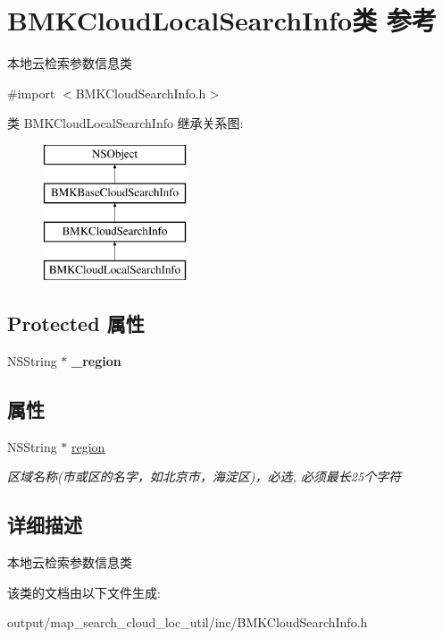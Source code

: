 \hypertarget{interface_b_m_k_cloud_local_search_info}{\section{B\+M\+K\+Cloud\+Local\+Search\+Info类 参考}
\label{interface_b_m_k_cloud_local_search_info}
}


本地云检索参数信息类  




{\ttfamily \#import $<$B\+M\+K\+Cloud\+Search\+Info.\+h$>$}

类 B\+M\+K\+Cloud\+Local\+Search\+Info 继承关系图\+:\begin{figure}[H]
\begin{center}
\leavevmode
\includegraphics[height=4.000000cm]{interface_b_m_k_cloud_local_search_info}
\end{center}
\end{figure}
\subsection*{Protected 属性}
\begin{DoxyCompactItemize}
\item 
\hypertarget{interface_b_m_k_cloud_local_search_info_a222e06088269c5b3e67d3f9a416d7eff}{N\+S\+String $\ast$ {\bfseries \+\_\+region}}\label{interface_b_m_k_cloud_local_search_info_a222e06088269c5b3e67d3f9a416d7eff}

\end{DoxyCompactItemize}
\subsection*{属性}
\begin{DoxyCompactItemize}
\item 
\hypertarget{interface_b_m_k_cloud_local_search_info_a0f5a080b5eed8356479c5b3f3e483e29}{N\+S\+String $\ast$ \hyperlink{interface_b_m_k_cloud_local_search_info_a0f5a080b5eed8356479c5b3f3e483e29}{region}}\label{interface_b_m_k_cloud_local_search_info_a0f5a080b5eed8356479c5b3f3e483e29}

\begin{DoxyCompactList}\small\item\em 区域名称(市或区的名字，如北京市，海淀区)，必选, 必须最长25个字符 \end{DoxyCompactList}\end{DoxyCompactItemize}


\subsection{详细描述}
本地云检索参数信息类 

该类的文档由以下文件生成\+:\begin{DoxyCompactItemize}
\item 
output/map\+\_\+search\+\_\+cloud\+\_\+loc\+\_\+util/inc/B\+M\+K\+Cloud\+Search\+Info.\+h\end{DoxyCompactItemize}
